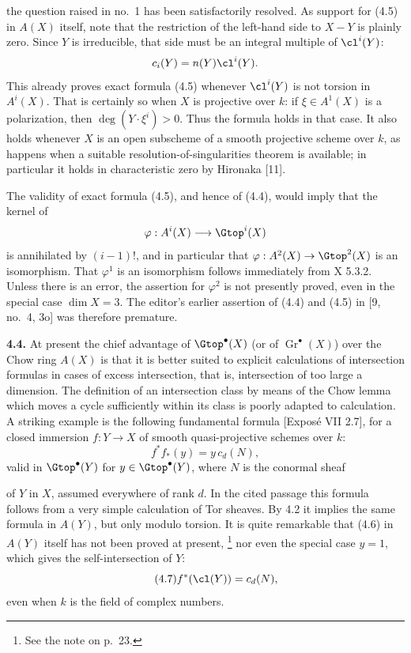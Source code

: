 the question raised in no.~1 has been satisfactorily resolved. As support
for (4.5) in $A(X)$ itself, note that the restriction of the left-hand side
to $X-Y$ is plainly zero. Since $Y$ is irreducible, that side must be an
integral multiple of $\cl^i(Y)$:
\[
 c_i(Y)=n(Y)\cl^i(Y).
\]
This already proves exact formula (4.5) whenever $\cl^i(Y)$ is not torsion
in $A^i(X)$. That is certainly so when $X$ is projective over $k$: if
$\xi\in A^1(X)$ is a polarization, then $\deg(Y\cdot\xi^i)>0$. Thus the
formula holds in that case. It also holds whenever $X$ is an open subscheme
of a smooth projective scheme over $k$, as happens when a suitable
resolution-of-singularities theorem is available; in particular it holds
in characteristic zero by Hironaka [11].

The validity of exact formula (4.5), and hence of (4.4), would imply that
the kernel of
\[
 \varphi:A^i(X)\longrightarrow\Gtop^i(X)
\]
is annihilated by $(i-1)!$, and in particular that
$\varphi:A^2(X)\to\Gtop^2(X)$ is an isomorphism. That $\varphi^1$ is an
isomorphism follows immediately from X 5.3.2. Unless there is an error,
the assertion for $\varphi^2$ is not presently proved, even in the special
case $\dim X=3$. The editor's earlier assertion of (4.4) and (4.5) in
[9, no.~4, 3o] was therefore premature.

\textbf{4.4.} At present the chief advantage of $\Gtop^\bullet(X)$ (or of
$\operatorname{Gr}^\bullet(X)$) over the Chow ring $A(X)$ is that it is
better suited to explicit calculations of intersection formulas in cases
of excess intersection, that is, intersection of too large a dimension.
The definition of an intersection class by means of the Chow lemma which
moves a cycle sufficiently within its class is poorly adapted to
calculation. A striking example is the following fundamental formula
[Exposé VII 2.7], for a closed immersion $f:Y\to X$ of smooth
quasi-projective schemes over $k$:
\begin{equation}\tag{4.6}
 f^*f_*(y)=y\,c_d(N),
\end{equation}
valid in $\Gtop^\bullet(Y)$ for $y\in\Gtop^\bullet(Y)$, where $N$ is the
conormal sheaf

of $Y$ in $X$, assumed everywhere of rank $d$. In the cited passage this
formula follows from a very simple calculation of Tor sheaves. By 4.2 it
implies the same formula in $A(Y)$, but only modulo torsion. It is quite
remarkable that (4.6) in $A(Y)$ itself has not been proved at present,
\footnote{See the note on p.~23.} nor even the special case $y=1$, which
gives the self-intersection of $Y$:
\begin{equation}\tag{4.7}
 f^*(\cl(Y))=c_d(N),
\end{equation}
even when $k$ is the field of complex numbers.

